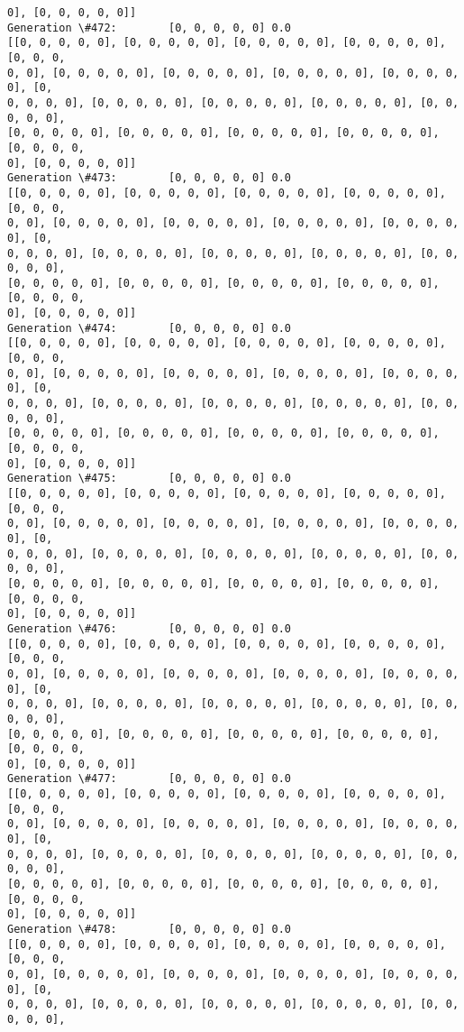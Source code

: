 \documentclass[11pt]{article}
\begin{document}
\begin{Verbatim}[commandchars=\\\{\}]
0], [0, 0, 0, 0, 0]]
Generation \#472:        [0, 0, 0, 0, 0] 0.0
[[0, 0, 0, 0, 0], [0, 0, 0, 0, 0], [0, 0, 0, 0, 0], [0, 0, 0, 0, 0], [0, 0, 0,
0, 0], [0, 0, 0, 0, 0], [0, 0, 0, 0, 0], [0, 0, 0, 0, 0], [0, 0, 0, 0, 0], [0,
0, 0, 0, 0], [0, 0, 0, 0, 0], [0, 0, 0, 0, 0], [0, 0, 0, 0, 0], [0, 0, 0, 0, 0],
[0, 0, 0, 0, 0], [0, 0, 0, 0, 0], [0, 0, 0, 0, 0], [0, 0, 0, 0, 0], [0, 0, 0, 0,
0], [0, 0, 0, 0, 0]]
Generation \#473:        [0, 0, 0, 0, 0] 0.0
[[0, 0, 0, 0, 0], [0, 0, 0, 0, 0], [0, 0, 0, 0, 0], [0, 0, 0, 0, 0], [0, 0, 0,
0, 0], [0, 0, 0, 0, 0], [0, 0, 0, 0, 0], [0, 0, 0, 0, 0], [0, 0, 0, 0, 0], [0,
0, 0, 0, 0], [0, 0, 0, 0, 0], [0, 0, 0, 0, 0], [0, 0, 0, 0, 0], [0, 0, 0, 0, 0],
[0, 0, 0, 0, 0], [0, 0, 0, 0, 0], [0, 0, 0, 0, 0], [0, 0, 0, 0, 0], [0, 0, 0, 0,
0], [0, 0, 0, 0, 0]]
Generation \#474:        [0, 0, 0, 0, 0] 0.0
[[0, 0, 0, 0, 0], [0, 0, 0, 0, 0], [0, 0, 0, 0, 0], [0, 0, 0, 0, 0], [0, 0, 0,
0, 0], [0, 0, 0, 0, 0], [0, 0, 0, 0, 0], [0, 0, 0, 0, 0], [0, 0, 0, 0, 0], [0,
0, 0, 0, 0], [0, 0, 0, 0, 0], [0, 0, 0, 0, 0], [0, 0, 0, 0, 0], [0, 0, 0, 0, 0],
[0, 0, 0, 0, 0], [0, 0, 0, 0, 0], [0, 0, 0, 0, 0], [0, 0, 0, 0, 0], [0, 0, 0, 0,
0], [0, 0, 0, 0, 0]]
Generation \#475:        [0, 0, 0, 0, 0] 0.0
[[0, 0, 0, 0, 0], [0, 0, 0, 0, 0], [0, 0, 0, 0, 0], [0, 0, 0, 0, 0], [0, 0, 0,
0, 0], [0, 0, 0, 0, 0], [0, 0, 0, 0, 0], [0, 0, 0, 0, 0], [0, 0, 0, 0, 0], [0,
0, 0, 0, 0], [0, 0, 0, 0, 0], [0, 0, 0, 0, 0], [0, 0, 0, 0, 0], [0, 0, 0, 0, 0],
[0, 0, 0, 0, 0], [0, 0, 0, 0, 0], [0, 0, 0, 0, 0], [0, 0, 0, 0, 0], [0, 0, 0, 0,
0], [0, 0, 0, 0, 0]]
Generation \#476:        [0, 0, 0, 0, 0] 0.0
[[0, 0, 0, 0, 0], [0, 0, 0, 0, 0], [0, 0, 0, 0, 0], [0, 0, 0, 0, 0], [0, 0, 0,
0, 0], [0, 0, 0, 0, 0], [0, 0, 0, 0, 0], [0, 0, 0, 0, 0], [0, 0, 0, 0, 0], [0,
0, 0, 0, 0], [0, 0, 0, 0, 0], [0, 0, 0, 0, 0], [0, 0, 0, 0, 0], [0, 0, 0, 0, 0],
[0, 0, 0, 0, 0], [0, 0, 0, 0, 0], [0, 0, 0, 0, 0], [0, 0, 0, 0, 0], [0, 0, 0, 0,
0], [0, 0, 0, 0, 0]]
Generation \#477:        [0, 0, 0, 0, 0] 0.0
[[0, 0, 0, 0, 0], [0, 0, 0, 0, 0], [0, 0, 0, 0, 0], [0, 0, 0, 0, 0], [0, 0, 0,
0, 0], [0, 0, 0, 0, 0], [0, 0, 0, 0, 0], [0, 0, 0, 0, 0], [0, 0, 0, 0, 0], [0,
0, 0, 0, 0], [0, 0, 0, 0, 0], [0, 0, 0, 0, 0], [0, 0, 0, 0, 0], [0, 0, 0, 0, 0],
[0, 0, 0, 0, 0], [0, 0, 0, 0, 0], [0, 0, 0, 0, 0], [0, 0, 0, 0, 0], [0, 0, 0, 0,
0], [0, 0, 0, 0, 0]]
Generation \#478:        [0, 0, 0, 0, 0] 0.0
[[0, 0, 0, 0, 0], [0, 0, 0, 0, 0], [0, 0, 0, 0, 0], [0, 0, 0, 0, 0], [0, 0, 0,
0, 0], [0, 0, 0, 0, 0], [0, 0, 0, 0, 0], [0, 0, 0, 0, 0], [0, 0, 0, 0, 0], [0,
0, 0, 0, 0], [0, 0, 0, 0, 0], [0, 0, 0, 0, 0], [0, 0, 0, 0, 0], [0, 0, 0, 0, 0],

\end{Verbatim}
\end{document}
